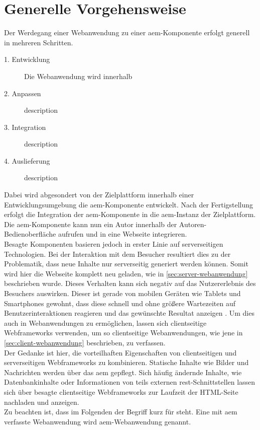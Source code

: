 \section{Generelle Vorgehensweise}
Der Werdegang einer Webanwendung zu einer \ac{aem}-Komponente erfolgt generell in mehreren Schritten.\\

\begin{description}
	\item[1. Entwicklung] Die Webanwendung wird innerhalb
	\item[2. Anpassen] description
	\item[3. Integration] description
	\item[4. Auslieferung] description
\end{description}

Dabei wird abgesondert von der Zielplattform innerhalb einer Entwicklungsumgebung die \ac{aem}-Komponente entwickelt. Nach der Fertigstellung erfolgt die Integration der \ac{aem}-Komponente in die \ac{aem}-Instanz der Zielplattform. Die \ac{aem}-Komponente kann nun ein Autor innerhalb der Autoren-Bedienoberfläche aufrufen und in eine Webseite integrieren.
\\
Besagte Komponenten basieren jedoch in erster Linie auf serverseitigen Technologien. Bei der Interaktion mit dem Besucher resultiert dies zu der Problematik, dass neue Inhalte nur serverseitig generiert werden können. Somit wird hier die Webseite komplett neu geladen, wie in \autoref{sec:server-webanwendung} beschrieben wurde. Dieses Verhalten kann sich negativ auf das Nutzererlebnis des Besuchers auswirken. Dieser ist gerade von mobilen Geräten wie Tablets und Smartphones gewohnt, dass diese schnell und ohne größere Wartezeiten auf Benutzerinteraktionen reagieren und das gewünschte Resultat anzeigen \cite[S. 78]{Rizvanoglu2013}. Um dies auch in Webanwendungen zu ermöglichen, lassen sich clientseitige Webframeworks verwenden, um so clientseitige Webanwendungen, wie jene in \autoref{sec:client-webanwendung} beschrieben, zu verfassen.\\
Der Gedanke ist hier, die vorteilhaften Eigenschaften von clientseitigen und serverseitigen Webframeworks zu kombinieren. Statische Inhalte wie Bilder und Nachrichten werden über das \ac{aem} gepflegt. Sich häufig ändernde Inhalte, wie Datenbankinhalte oder Informationen von teils externen \ac{rest}-Schnittstellen lassen sich über besagte clientseitige Webframeworks zur Laufzeit der HTML-Seite nachladen und anzeigen. \\
Zu beachten ist, dass im Folgenden der Begriff  kurz für  steht. Eine mit \ac{aem} verfasste Webanwendung wird \ac{aem}-Webanwendung genannt.